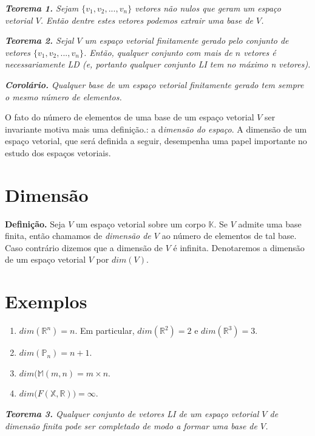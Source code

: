 \textit{\textbf{Teorema 1.}  Sejam  $\{v_1, v_2,..., v_n\}$    vetores não nulos que geram um espaço vetorial $V$. Então dentre estes vetores podemos extrair uma base de $V$.}

\vspace{0.3cm}

\textit{\textbf{Teorema 2.} Sejal $V$  um espaço vetorial finitamente gerado pelo  conjunto  de vetores  $\{v_1, v_2,..., v_n\}$.  Então, qualquer conjunto com mais de $n$ vetores é necessariamente LD (e, portanto qualquer conjunto LI tem no máximo n vetores).}

\vspace{0.3cm}

\textit{\textbf{Corolário.} Qualquer base de um espaço vetorial finitamente gerado tem sempre o mesmo número de elementos. }

\vspace{0.3cm}

O fato do número de elementos de uma base de um  espaço vetorial $V$ ser invariante  motiva mais uma definição.: a d\textit{imensão do espaço}. A dimensão de um espaço vetorial, que será definida a seguir, desempenha uma papel importante no estudo dos espaços vetoriais.
\vspace{0.3cm}

\section{Dimensão}
\textbf{Definição.} Seja $V$ um espaço vetorial sobre um corpo $\mathbb{K}$. Se $V$ admite uma base finita, então chamamos de \textit{dimensão de $V$} ao número de elementos de tal base. Caso contrário dizemos que a dimensão de $V$ é infinita.   Denotaremos a dimensão de um espaço  vetorial $V$ por $dim (V)$.


\section{Exemplos}
\begin{enumerate}
\item $dim(\mathbb{R}^n)=n$. Em particular,  $dim(\mathbb{R}^2)=2$  e  $dim(\mathbb{R}^3)=3$.
\item  $dim(\mathbb{P}_n)=n+1$.
\item  $dim(\mathbb{M}(m,n)=m\times n$.
\item  $dim\mathbb ({F}(\mathbb{X},\mathbb{R}))=\infty $.
\end{enumerate}

\textit{\textbf{Teorema 3.} Qualquer conjunto de vetores LI de um espaço vetorial $V$ de dimensão finita pode ser completado de modo a formar uma base de $V$.}

